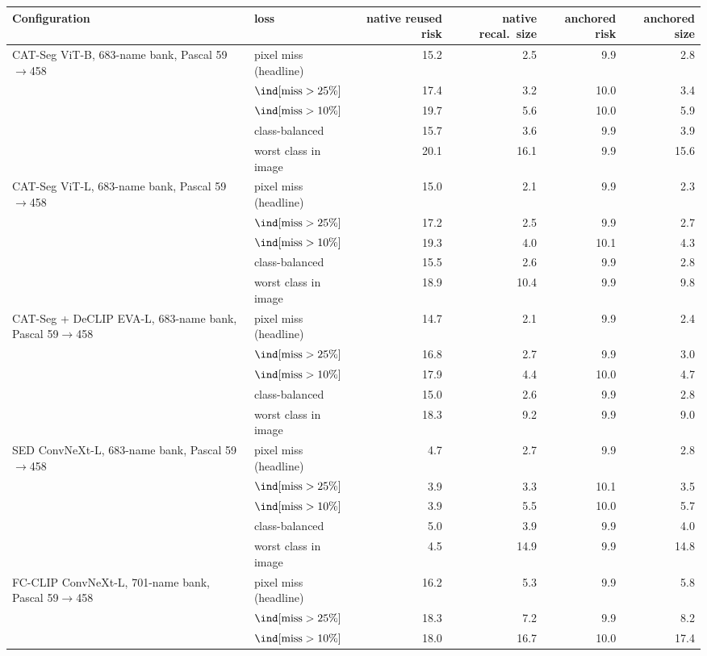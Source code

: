 \begin{tabular}{@{}llrrrr@{}}
\toprule
Configuration & loss & native reused risk & native recal.\ size & anchored risk & anchored size \\
\midrule
CAT-Seg ViT-B, 683-name bank, Pascal 59$\to$458 & pixel miss (headline) & 15.2 & 2.5 & 9.9 & 2.8 \\
 & $\ind[\text{miss} > 25\%]$ & 17.4 & 3.2 & 10.0 & 3.4 \\
 & $\ind[\text{miss} > 10\%]$ & 19.7 & 5.6 & 10.0 & 5.9 \\
 & class-balanced & 15.7 & 3.6 & 9.9 & 3.9 \\
 & worst class in image & 20.1 & 16.1 & 9.9 & 15.6 \\
\midrule
CAT-Seg ViT-L, 683-name bank, Pascal 59$\to$458 & pixel miss (headline) & 15.0 & 2.1 & 9.9 & 2.3 \\
 & $\ind[\text{miss} > 25\%]$ & 17.2 & 2.5 & 9.9 & 2.7 \\
 & $\ind[\text{miss} > 10\%]$ & 19.3 & 4.0 & 10.1 & 4.3 \\
 & class-balanced & 15.5 & 2.6 & 9.9 & 2.8 \\
 & worst class in image & 18.9 & 10.4 & 9.9 & 9.8 \\
\midrule
CAT-Seg + DeCLIP EVA-L, 683-name bank, Pascal 59$\to$458 & pixel miss (headline) & 14.7 & 2.1 & 9.9 & 2.4 \\
 & $\ind[\text{miss} > 25\%]$ & 16.8 & 2.7 & 9.9 & 3.0 \\
 & $\ind[\text{miss} > 10\%]$ & 17.9 & 4.4 & 10.0 & 4.7 \\
 & class-balanced & 15.0 & 2.6 & 9.9 & 2.8 \\
 & worst class in image & 18.3 & 9.2 & 9.9 & 9.0 \\
\midrule
SED ConvNeXt-L, 683-name bank, Pascal 59$\to$458 & pixel miss (headline) & 4.7 & 2.7 & 9.9 & 2.8 \\
 & $\ind[\text{miss} > 25\%]$ & 3.9 & 3.3 & 10.1 & 3.5 \\
 & $\ind[\text{miss} > 10\%]$ & 3.9 & 5.5 & 10.0 & 5.7 \\
 & class-balanced & 5.0 & 3.9 & 9.9 & 4.0 \\
 & worst class in image & 4.5 & 14.9 & 9.9 & 14.8 \\
\midrule
FC-CLIP ConvNeXt-L, 701-name bank, Pascal 59$\to$458 & pixel miss (headline) & 16.2 & 5.3 & 9.9 & 5.8 \\
 & $\ind[\text{miss} > 25\%]$ & 18.3 & 7.2 & 9.9 & 8.2 \\
 & $\ind[\text{miss} > 10\%]$ & 18.0 & 16.7 & 10.0 & 17.4 \\

\end{tabular}
